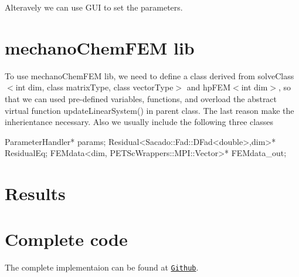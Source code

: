  Alteravely we can use G\-U\-I to set the parameters. \hypertarget{brain_morph_lib}{}\section{mechano\-Chem\-F\-E\-M lib}\label{brain_morph_lib}
To use mechano\-Chem\-F\-E\-M lib, we need to define a class derived from {\ttfamily solve\-Class$<$int dim, class matrix\-Type, class vector\-Type$>$} and {\ttfamily hp\-F\-E\-M$<$int dim$>$}, so that we can used pre-\/defined variables, functions, and overload the abstract virtual function {\ttfamily update\-Linear\-System()} in parent class. The last reason make the inherientance necessary. Also we usually include the following three classes 
\begin{DoxyCode}
ParameterHandler* params;   
Residual<Sacado::Fad::DFad<double>,dim>* ResidualEq;
FEMdata<dim, PETScWrappers::MPI::Vector>* FEMdata\_out;
\end{DoxyCode}
 \hypertarget{growth_results}{}\section{Results}\label{growth_results}
    \hypertarget{brain_morph_com}{}\section{Complete code}\label{brain_morph_com}
The complete implementaion can be found at \href{https://github.com/mechanoChem/mechanoChemFEM/tree/example/brainMorph}{\tt Github}. 